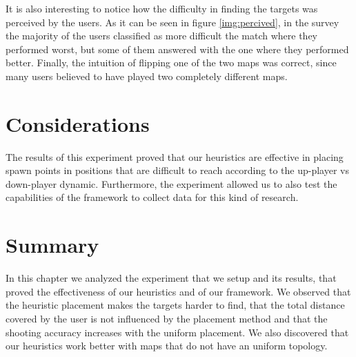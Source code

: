 It is also interesting to notice how the difficulty in finding the targets was perceived by the users. As it can be seen in figure \ref{img:percived}, in the survey the majority of the users classified as more difficult the match where they performed worst, but some of them answered with the one where they performed better. Finally, the intuition of flipping one of the two maps was correct, since many users believed to have played two completely different maps. 


\section{Considerations}

The results of this experiment proved that our heuristics are effective in placing spawn points in positions that are difficult to reach according to the up-player vs down-player dynamic. Furthermore, the experiment allowed us to also test the capabilities of the framework to collect data for this kind of research.


\section{Summary}

In this chapter we analyzed the experiment that we setup and its results, that proved the effectiveness of our heuristics and of our framework. We observed that the heuristic placement makes the targets harder to find, that the total distance covered by the user is not influenced by the placement method and that the shooting accuracy increases with the uniform placement. We also discovered that our heuristics work better with maps that do not have an uniform topology.